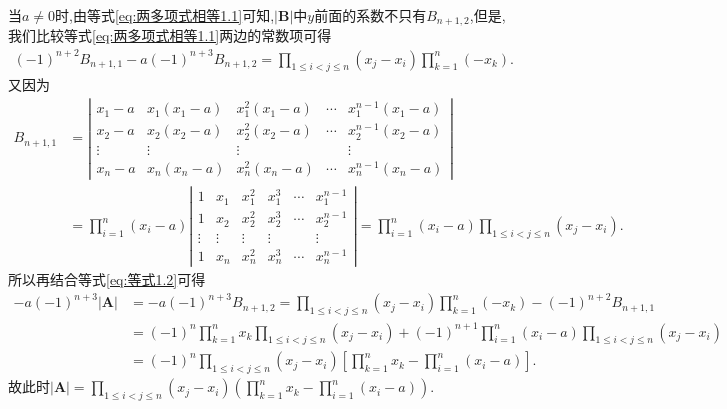 \documentclass[../../main.tex]{subfiles}
\begin{document}
\begin{solution}
当\(a\neq 0\)时,由等式\eqref{eq:两多项式相等1.1}可知,\(|\boldsymbol{B}|\)中\(y\)前面的系数不只有\(B_{n + 1,2}\),但是,我们比较等式\eqref{eq:两多项式相等1.1}两边的常数项可得
\begin{align}\label{eq:等式1.2}
(-1)^{n + 2}B_{n + 1,1}-a(-1)^{n + 3}B_{n + 1,2}=\prod_{1\leqslant i < j\leqslant n}(x_j - x_i)\prod_{k = 1}^{n}(-x_k).
\end{align}
又因为
\begin{align*}
B_{n + 1,1}&=\left|\begin{matrix}
x_1 - a & x_1(x_1 - a) & x_{1}^{2}(x_1 - a) & \cdots & x_{1}^{n - 1}(x_1 - a)\\
x_2 - a & x_2(x_2 - a) & x_{2}^{2}(x_2 - a) & \cdots & x_{2}^{n - 1}(x_2 - a)\\
\vdots & \vdots & \vdots &  & \vdots\\
x_n - a & x_n(x_n - a) & x_{n}^{2}(x_n - a) & \cdots & x_{n}^{n - 1}(x_n - a)
\end{matrix}\right|
\\
&=\prod_{i = 1}^{n}(x_i - a)\left|\begin{matrix}
1 & x_1 & x_{1}^{2} & x_{1}^{3} & \cdots & x_{1}^{n - 1}\\
1 & x_2 & x_{2}^{2} & x_{2}^{3} & \cdots & x_{2}^{n - 1}\\
\vdots & \vdots & \vdots & \vdots &  & \vdots\\
1 & x_n & x_{n}^{2} & x_{n}^{3} & \cdots & x_{n}^{n - 1}
\end{matrix}\right|=\prod_{i = 1}^{n}(x_i - a)\prod_{1\leqslant i < j\leqslant n}(x_j - x_i).
\end{align*}
所以再结合等式\eqref{eq:等式1.2}可得
\begin{align*}
-a(-1)^{n + 3}|\boldsymbol{A}|&=-a(-1)^{n + 3}B_{n + 1,2}=\prod_{1\leqslant i < j\leqslant n}(x_j - x_i)\prod_{k = 1}^{n}(-x_k)-(-1)^{n + 2}B_{n + 1,1}
\\
&=(-1)^n\prod_{k = 1}^{n}x_k\prod_{1\leqslant i < j\leqslant n}(x_j - x_i)+(-1)^{n + 1}\prod_{i = 1}^{n}(x_i - a)\prod_{1\leqslant i < j\leqslant n}(x_j - x_i)
\\
&=(-1)^n\prod_{1\leqslant i < j\leqslant n}(x_j - x_i)\left[\prod_{k = 1}^{n}x_k-\prod_{i = 1}^{n}(x_i - a)\right].
\end{align*}
故此时\(|\boldsymbol{A}|=\prod_{1\leqslant i < j\leqslant n}(x_j - x_i)\left(\prod_{k = 1}^{n}x_k-\prod_{i = 1}^{n}(x_i - a)\right)\).
\end{solution}
\end{document}
